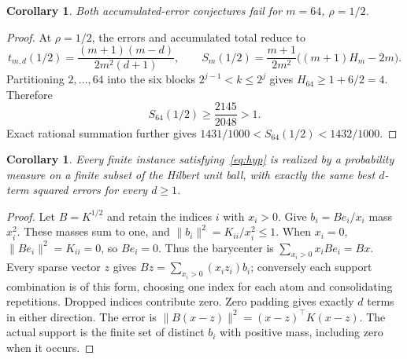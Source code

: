\documentclass[11pt]{article}
\newtheorem{corollary}[theorem]{Corollary}
\begin{document}
\begin{corollary}\label{cor:witness}
Both accumulated-error conjectures fail for $m=64$, $\rho=1/2$.
\end{corollary}
\begin{proof}
At $\rho=1/2$, the errors and accumulated total reduce to
\[
 t_{m,d}(1/2)=\frac{(m+1)(m-d)}{2m^2(d+1)},\qquad
 S_m(1/2)=\frac{m+1}{2m^2}\bigl((m+1)H_m-2m\bigr).
\]
Partitioning $2,\ldots,64$ into the six blocks
$2^{j-1}<k\leq2^j$ gives $H_{64}\geq1+6/2=4$. Therefore
\begin{equation}\label{eq:certificate}
 S_{64}(1/2)\geq\frac{2145}{2048}>1.
\end{equation}
Exact rational summation further gives
$1431/1000<S_{64}(1/2)<1432/1000$.
\end{proof}

\begin{corollary}\label{cor:bridge}
Every finite instance satisfying~\eqref{eq:hyp} is realized by a probability
measure on a finite subset of the Hilbert unit ball, with exactly the same
best $d$-term squared errors for every $d\geq1$.
\end{corollary}
\begin{proof}
Let $B=K^{1/2}$ and retain the indices $i$ with $x_i>0$.
Give $b_i=Be_i/x_i$ mass $x_i^2$. These masses sum to one, and
$\|b_i\|^2=K_{ii}/x_i^2\leq1$.
When $x_i=0$, $\|Be_i\|^2=K_{ii}=0$, so $Be_i=0$.
Thus the barycenter is $\sum_{x_i>0}x_iBe_i=Bx$.
Every sparse vector $z$ gives $Bz=\sum_{x_i>0}(x_i z_i)b_i$;
conversely each support combination is of this form, choosing one index
for each atom and consolidating repetitions. Dropped indices contribute
zero. Zero padding gives exactly $d$ terms in either direction.
The error is $\|B(x-z)\|^2=(x-z)^\top K(x-z)$.
The actual support is the finite set of distinct $b_i$ with positive mass,
including zero when it occurs.
\end{proof}
\end{document}
